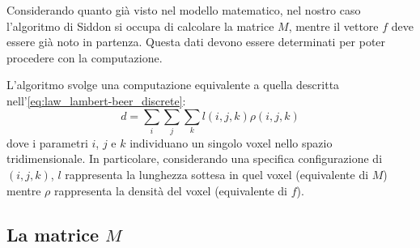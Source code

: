 \documentclass[12pt,a4paper]{report}
\begin{document}
Considerando quanto già visto nel modello matematico, nel nostro caso l'algoritmo di Siddon si occupa di calcolare la matrice
\(M\), mentre il vettore \(f\) deve essere già noto in partenza.
Questa dati devono essere determinati per poter procedere con la computazione.

L'algoritmo svolge una computazione equivalente a quella descritta nell'\autoref{eq:law_lambert-beer_discrete}:
\begin{equation*}
  d = \sum_i \sum_j \sum_k l(i, j, k) \rho(i, j, k)
\end{equation*}
dove i parametri \(i\), \(j\) e \(k\) individuano un singolo voxel nello spazio tridimensionale.
In particolare, considerando una specifica configurazione di \((i, j, k)\), \(l\) rappresenta la lunghezza sottesa in quel
voxel (equivalente di \(M\)) mentre \(\rho\) rappresenta la densità del voxel (equivalente di \(f\)).

\subsection{La matrice \(M\)}
\end{document}
